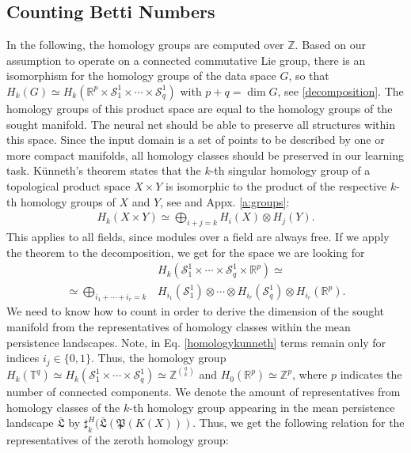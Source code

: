 \documentclass[envcountsect,runningheads]{llncs}
\begin{document}
\subsection{Counting Betti Numbers}
In the following, the homology groups are computed over $\mathbb{Z}$. Based on our assumption to operate on a connected commutative Lie group, there is an isomorphism for the homology groups of the data space $G$, so that $H_k(G) \simeq H_k(\mathbb{R}^p \times \mathcal{S}^{1}_{1}\times\cdots\times\mathcal{S}^{1}_{q})$ with $p+q = \dim G$, see \ref{decomposition}. The homology groups of this product space are equal to the homology groups of the sought manifold. The neural net should be able to preserve all structures within this space. Since the input domain is a set of points to be described by one or more compact manifolds, all homology classes should be preserved in our learning task. Künneth's theorem states that the $k$-th singular homology group of a topological product space $X \times Y$ is isomorphic to the product of the respective $k$-th homology groups of $X$ and $Y$, see  and Appx. \ref{a:groups}:
\begin{align}
    H_k(X \times Y) \simeq \bigoplus_{i+j=k}H_i(X) \otimes H_j(Y).
\end{align}
This applies to all fields, since modules over a field are always free. If we apply the theorem to the decomposition, we get for the space we are looking for
\begin{align}
	\label{homologykunneth}
    &H_k(\mathcal{S}^{1}_{1}\times\cdots\times \mathcal{S}^{1}_{q}\times\mathbb{R}^p) \simeq \\
    \simeq \bigoplus_{i_{1} + \cdots + i_{r}=k} &H_{i_{1}}(\mathcal{S}^{1}_{1}) \otimes \cdots \otimes H_{i_{\hat{r}}}(\mathcal{S}^{1}_{q}) \otimes H_{i_{r}}(\mathbb{R}^{p}).
\end{align}
We need to know how to count in order to derive the dimension of the sought manifold from the representatives of homology classes within the mean persistence landscapes. Note, in Eq. \ref{homologykunneth} terms remain only for indices $i_{j} \in \{0,1\}$. Thus, the homology group $H_k(\mathbb{T}^{q}) \simeq H_k(\mathcal{S}^{1}_{1} \times \cdots \times \mathcal{S}^{1}_{q}) \simeq \mathbb{Z}^{{q\choose{k}}}$ and $H_0(\mathbb{R}^p)\simeq\mathbb{Z}^{p}$, where $p$ indicates the number of connected components. We denote the amount of representatives from homology classes of the $k$-th homology group appearing in the mean persistence landscape $\bar{\mathfrak{L}}$ by $\sharp^{H}_{k}(\bar{\mathfrak{L}}(\mathfrak{P}(K(X)))$. Thus, we get the following relation for the representatives of the zeroth homology group:
\end{document}
